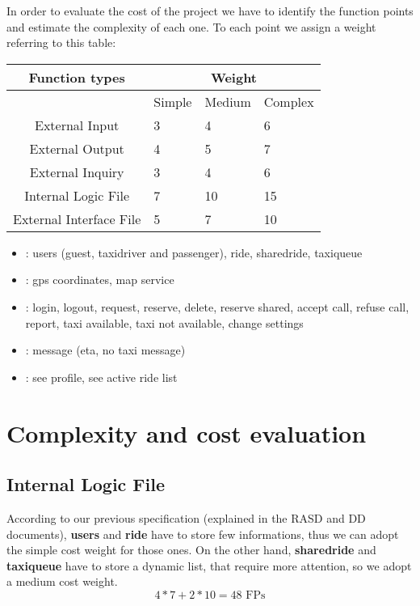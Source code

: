 In order to evaluate the cost of the project we have to identify 
the function points and estimate the complexity of each one.
To each point we assign a weight referring to this table:\\

\begin{tabular}{ | c | l | l | l |}
    \hline
     Function types & \multicolumn{3}{|c|}{Weight} \\\hline
       & Simple  & Medium & Complex \\ \hline
    External Input & 3 & 4 & 6   \\ \hline
    External Output & 4 & 5 & 7 \\ \hline
    External Inquiry & 3 & 4  & 6 \\ \hline
    Internal Logic File & 7 & 10 & 15 \\ \hline
    External Interface File & 5 & 7 & 10  \\ \hline
    \end{tabular}

\begin{itemize}
  \item{: users (guest, taxidriver and passenger), 
                               ride, sharedride, taxiqueue}
  \item{: gps coordinates, map service}
  \item{: login, logout, request, reserve, delete, reserve shared,
                         accept call, refuse call, report, taxi available,
                         taxi not available, change settings}
  \item{: message (eta, no taxi message)}
  \item{: see profile, see active ride list}
\end{itemize}


\section{Complexity and cost evaluation}
  \subsection{Internal Logic File}
  According to our previous specification (explained in the RASD and DD documents),
  \textbf{users} and \textbf{ride} have to store few informations, thus we can adopt the
  simple cost weight for those ones.
  On the other hand, \textbf{sharedride} and \textbf{taxiqueue} have to store a dynamic
  list, that require more attention, so we adopt a medium cost weight.
  \begin{equation}
   4*7 + 2*10 = 48 \text{ FPs}
  \end{equation}

